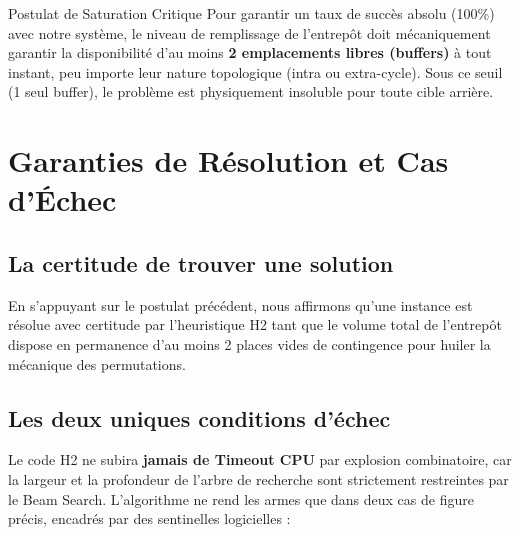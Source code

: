 \documentclass[11pt,a4paper]{article}
\begin{document}
\begin{myhyp}{Postulat de Saturation Critique}
Pour garantir un taux de succès absolu (100\%) avec notre système, le niveau de remplissage de l'entrepôt doit mécaniquement garantir la disponibilité d'au moins \textbf{2 emplacements libres (buffers)} à tout instant, peu importe leur nature topologique (intra ou extra-cycle). Sous ce seuil (1 seul buffer), le problème est physiquement insoluble pour toute cible arrière.
\end{myhyp}

\section{Garanties de Résolution et Cas d'Échec}

\subsection{La certitude de trouver une solution}
En s'appuyant sur le postulat précédent, nous affirmons qu'une instance est résolue avec certitude par l'heuristique H2 tant que le volume total de l'entrepôt dispose en permanence d'au moins 2 places vides de contingence pour huiler la mécanique des permutations.

\subsection{Les deux uniques conditions d'échec}
Le code H2 ne subira \textbf{jamais de Timeout CPU} par explosion combinatoire, car la largeur et la profondeur de l'arbre de recherche sont strictement restreintes par le Beam Search. L'algorithme ne rend les armes que dans deux cas de figure précis, encadrés par des sentinelles logicielles :
\end{document}
